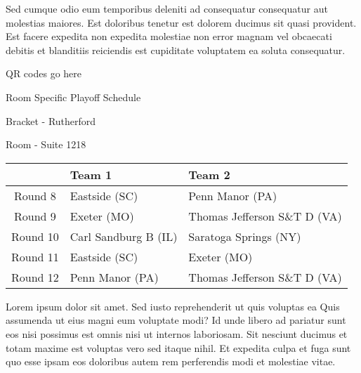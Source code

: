 \documentclass{article}%
\begin{document}
\newline%
Sed cumque odio eum temporibus deleniti ad consequatur consequatur aut molestias maiores. Est doloribus tenetur est dolorem ducimus sit quasi provident. Est facere expedita non expedita molestiae non error magnam vel obcaecati debitis et blanditiis reiciendis est cupiditate voluptatem ea soluta consequatur.%
\vspace*{140pt}%
\begin{center}%
\begin{Huge}%
QR codes go here%
\end{Huge}%
\end{center}%
\newpage%
\begin{center}%
\begin{Huge}%
Room Specific Playoff Schedule%
\end{Huge}%
\vspace*{8pt}%
\linebreak%
\begin{Large}%
Bracket {-} Rutherford%
\end{Large}%
\vspace*{8pt}%
\linebreak%
\vspace*{8pt}%
\begin{Large}%
Room {-} Suite 1218%
\end{Large}%
\end{center}%
%
\begin{tabularx}{\textwidth}{|c|Y|Y|}%
\hline%
&Team 1&Team 2\\%
\hline%
Round 8&Eastside (SC)&Penn Manor (PA)\\%
Round 9&Exeter (MO)&Thomas Jefferson S\&T D (VA)\\%
Round 10&Carl Sandburg B (IL)&Saratoga Springs (NY)\\%
Round 11&Eastside (SC)&Exeter (MO)\\%
Round 12&Penn Manor (PA)&Thomas Jefferson S\&T D (VA)\\%
\hline%
\end{tabularx}%
\vspace*{8pt}%
\newline%
Lorem ipsum dolor sit amet. Sed iusto reprehenderit ut quis voluptas ea Quis assumenda ut eius magni eum voluptate modi? Id unde libero ad pariatur sunt eos nisi possimus est omnis nisi ut internos laboriosam. Sit nesciunt ducimus et totam maxime est voluptas vero sed itaque nihil. Et expedita culpa et fuga sunt quo esse ipsam eos doloribus autem rem perferendis modi et molestiae vitae.\newline%
\end{document}
